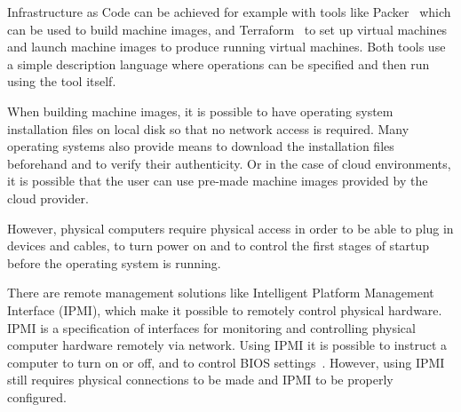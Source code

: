 Infrastructure as Code can be achieved for example with tools like
Packer~\cite{packer} which can be used to build machine images, and
Terraform~\cite{terraform} to set up virtual machines and launch
machine images to produce running virtual machines. Both tools use a
simple description language where operations can be specified and then
run using the tool itself.

When building machine images, it is possible to have operating system
installation files on local disk so that no network access is
required. Many operating systems also provide means to download the
installation files beforehand and to verify their authenticity. Or in
the case of cloud environments, it is possible that the user can use
pre-made machine images provided by the cloud provider.

However, physical computers require physical access in order to be
able to plug in devices and cables, to turn power on and to control
the first stages of startup before the operating system is running.

There are remote management solutions like Intelligent Platform
Management Interface (IPMI), which make it possible to remotely
control physical hardware. IPMI is a specification of interfaces for
monitoring and controlling physical computer hardware remotely via
network. Using IPMI it is possible to instruct a computer to turn on
or off, and to control BIOS settings~\cite{ipmi-spec}. However, using
IPMI still requires physical connections to be made and IPMI to be
properly configured.
